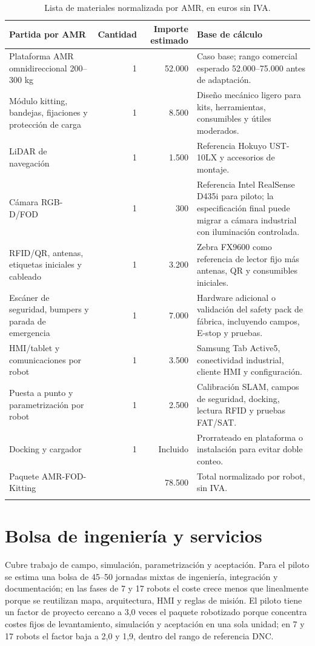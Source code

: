 \begin{longtable}{P{0.26\textwidth}r r P{0.30\textwidth}}
\toprule
Partida por AMR & Cantidad & Importe estimado & Base de cálculo\\
\midrule
\endhead
Plataforma AMR omnidireccional 200--300 kg & 1 & 52.000 & Caso base; rango comercial esperado 52.000--75.000 \texteuro{} antes de adaptación.\\
Módulo kitting, bandejas, fijaciones y protección de carga & 1 & 8.500 & Diseño mecánico ligero para kits, herramientas, consumibles y útiles moderados.\\
LiDAR de navegación & 1 & 1.500 & Referencia Hokuyo UST-10LX y accesorios de montaje.\\
Cámara RGB-D/FOD & 1 & 300 & Referencia Intel RealSense D435i para piloto; la especificación final puede migrar a cámara industrial con iluminación controlada.\\
RFID/QR, antenas, etiquetas iniciales y cableado & 1 & 3.200 & Zebra FX9600 como referencia de lector fijo más antenas, QR y consumibles iniciales.\\
Escáner de seguridad, bumpers y parada de emergencia & 1 & 7.000 & Hardware adicional o validación del safety pack de fábrica, incluyendo campos, E-stop y pruebas.\\
HMI/tablet y comunicaciones por robot & 1 & 3.500 & Samsung Tab Active5, conectividad industrial, cliente HMI y configuración.\\
Puesta a punto y parametrización por robot & 1 & 2.500 & Calibración SLAM, campos de seguridad, docking, lectura RFID y pruebas FAT/SAT.\\
\midrule
Docking y cargador & 1 & Incluido & Prorrateado en plataforma o instalación para evitar doble conteo.\\
\midrule
Paquete AMR-FOD-Kitting &  & 78.500 & Total normalizado por robot, sin IVA.\\
\bottomrule
\caption{Lista de materiales normalizada por AMR, en euros sin IVA.}
\label{tab:bom-amr}
\end{longtable}

\section{Bolsa de ingeniería y servicios}

Cubre trabajo de campo, simulación, parametrización y aceptación. Para el piloto se estima una bolsa de 45--50 jornadas mixtas de ingeniería, integración y documentación; en las fases de 7 y 17 robots el coste crece menos que linealmente porque se reutilizan mapa, arquitectura, HMI y reglas de misión. El piloto tiene un factor de proyecto cercano a 3,0 veces el paquete robotizado porque concentra costes fijos de levantamiento, simulación y aceptación en una sola unidad; en 7 y 17 robots el factor baja a 2,0 y 1,9, dentro del rango de referencia DNC.

